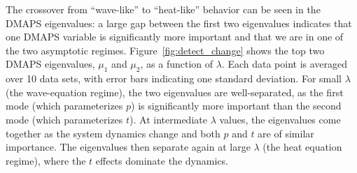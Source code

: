 \documentclass[prl, reprint, final, showkeys]{revtex4-1}
\begin{document}
The crossover from ``wave-like'' to ``heat-like'' behavior can be seen in the DMAPS eigenvalues: a large gap between the first two eigenvalues indicates that one DMAPS variable is significantly more important and that we are in one of the two asymptotic regimes.
%
Figure~\ref{fig:detect_change} shows the top two DMAPS eigenvalues, $\mu_1$ and $\mu_2$, as a function of $\lambda$. 
%
Each data point is averaged over 10 data sets, with error bars indicating one standard deviation. 
%
For small $\lambda$ (the wave-equation regime), the two eigenvalues are well-separated, as the first mode (which parameterizes $p$) is significantly more important than the second mode (which parameterizes $t$).
%
At intermediate $\lambda$ values, the eigenvalues come together as the system dynamics change and both $p$ and $t$ are of similar importance.
%
The eigenvalues then separate again at large $\lambda$ (the heat equation regime), where the $t$ effects dominate the dynamics.

\end{document}
